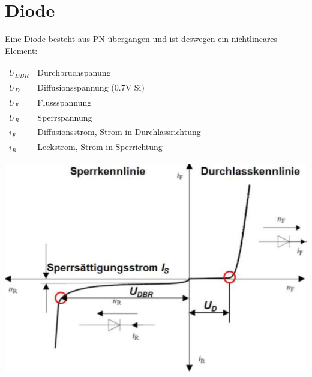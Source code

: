\section{Diode}
Eine Diode besteht aus PN übergängen und ist deswegen ein nichtlineares Element:
\begin{multicols}{2}
     \begin{minipage}{\linewidth}
         \begin{tabular}{ll}
             $ U_{DBR} $    & Durchbruchspanung  \\ 
             $ U_D $        & Diffusionsspannung (0.7V Si)  \\ 
             $ U_F $        & Flussspannung \\ 
             $ U_R $        & Sperrspannung  \\ 
              $ i_F $       & Diffusionsstrom, Strom in Durchlassrichtung  \\ 
              $ i_R $       & Leckstrom, Strom in Sperrichtung \\ 
            \end{tabular} 
        \end{minipage}
        
         \includegraphics[width=0.8\linewidth]{images/kennlinieDiode}
\end{multicols}
\vspace{-1.5cm}
